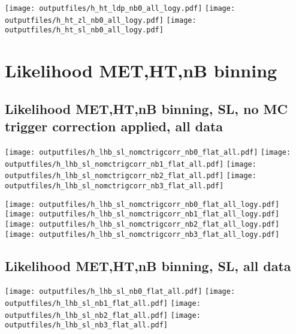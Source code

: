 \documentclass[11pt]{article}
\begin{document}
    \noindent
    \texttt{[image: outputfiles/h\_ht\_ldp\_nb0\_all\_logy.pdf]}
    \texttt{[image: outputfiles/h\_ht\_zl\_nb0\_all\_logy.pdf]}
    \texttt{[image: outputfiles/h\_ht\_sl\_nb0\_all\_logy.pdf]}







   \section{Likelihood MET,HT,nB binning}
    \subsection{ Likelihood MET,HT,nB binning, SL, no MC trigger correction applied, all data}

    \noindent
     \texttt{[image: outputfiles/h\_lhb\_sl\_nomctrigcorr\_nb0\_flat\_all.pdf]}
     \texttt{[image: outputfiles/h\_lhb\_sl\_nomctrigcorr\_nb1\_flat\_all.pdf]}
     \texttt{[image: outputfiles/h\_lhb\_sl\_nomctrigcorr\_nb2\_flat\_all.pdf]}
     \texttt{[image: outputfiles/h\_lhb\_sl\_nomctrigcorr\_nb3\_flat\_all.pdf]}

    \noindent
     \texttt{[image: outputfiles/h\_lhb\_sl\_nomctrigcorr\_nb0\_flat\_all\_logy.pdf]}
     \texttt{[image: outputfiles/h\_lhb\_sl\_nomctrigcorr\_nb1\_flat\_all\_logy.pdf]}
     \texttt{[image: outputfiles/h\_lhb\_sl\_nomctrigcorr\_nb2\_flat\_all\_logy.pdf]}
     \texttt{[image: outputfiles/h\_lhb\_sl\_nomctrigcorr\_nb3\_flat\_all\_logy.pdf]}

    \clearpage

    \subsection{ Likelihood MET,HT,nB binning, SL, all data}

    \noindent
     \texttt{[image: outputfiles/h\_lhb\_sl\_nb0\_flat\_all.pdf]}
     \texttt{[image: outputfiles/h\_lhb\_sl\_nb1\_flat\_all.pdf]}
     \texttt{[image: outputfiles/h\_lhb\_sl\_nb2\_flat\_all.pdf]}
     \texttt{[image: outputfiles/h\_lhb\_sl\_nb3\_flat\_all.pdf]}
\end{document}
